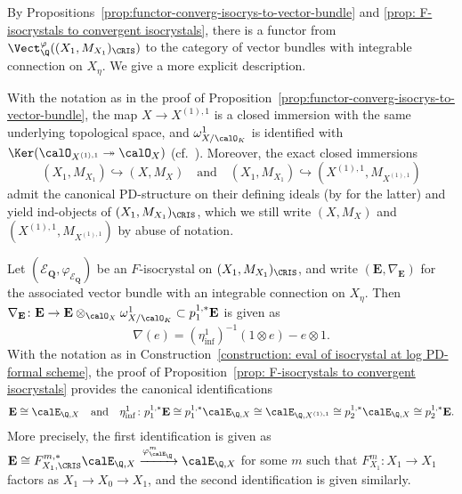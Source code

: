 \begin{rem}\label{rem:integrable connection associated to F-isocrystal}
By Propositions~\ref{prop:functor-converg-isocrys-to-vector-bundle} and \ref{prop: F-isocrystals to convergent isocrystals}, there is a functor from $\Vect_\Q^\varphi((X_1,M_{X_1})_\CRIS)$ to the category of vector bundles with integrable connection on $X_{\eta}$. We give a more explicit description.

With the notation as in the proof of Proposition~\ref{prop:functor-converg-isocrys-to-vector-bundle}, the map $X\rightarrow X^{(1),1}$ is a closed immersion with the same underlying topological space, and
$\omega^1_{X/\calO_K}$ is identified with $\Ker(\calO_{X^{(1),1}}\twoheadrightarrow\calO_X)$ (cf.~\cite[Prop.~3.2.5]{Shiho-I}).
Moreover, the exact closed immersions 
\[
(X_1,M_{X_1})\hookrightarrow (X,M_X) \quad\text{and}\quad (X_1,M_{X_1})\hookrightarrow (X^{(1),1},M_{X^{(1),1}})
\]
admit the canonical PD-structure on their defining ideals (by \cite[Ex.~3.2.4]{berthelot-ogus-book} for the latter) and yield ind-objects of $(X_1,M_{X_1})_\CRIS$, which we still write $(X,M_X)$ and $(X^{(1),1},M_{X^{(1),1}})$ by abuse of notation.

Let $(\mathcal{E}_{\mathbf{Q}},\varphi_{\mathcal{E}_{\mathbf{Q}}})$ be an $F$-isocrystal on $(X_1,M_{X_1})_{\CRIS}$, and write $(\mathbf{E},\nabla_{\mathbf{E}})$ for the associated vector bundle with an integrable connection on $X_{\eta}$. 
Then $\nabla_{\mathbf{E}}\colon \mathbf{E}\rightarrow \mathbf{E}\otimes_{\calO_X}\omega^1_{X/\calO_K}\subset p_{1}^{1,\ast}\mathbf{E}$ is given as 
\begin{equation}\label{eq:connection and stratification}
\nabla(e)=(\eta_{\mathrm{inf}}^1)^{-1}(1\otimes e)-e\otimes 1.
\end{equation}
With the notation as in Construction~\ref{construction: eval of isocrystal at log PD-formal scheme}, the proof of Proposition~\ref{prop: F-isocrystals to convergent isocrystals} provides the canonical identifications
\[
\mathbf{E}\cong\calE_{\Q,X}\quad\text{and}\quad
\eta_{\mathrm{inf}}^1\colon p_{1}^{1,\ast}\mathbf{E}\cong p_{1}^{1,\ast}\calE_{\Q,X}\cong \calE_{\Q,X^{(1),1}}\cong p_{2}^{1,\ast}\calE_{\Q,X}\cong p_{2}^{1,\ast}\mathbf{E}.
\]
More precisely, the first identification is given as $\mathbf{E}\cong F_{X_1,\CRIS}^{m,\ast}\calE_{\Q,X}\xrightarrow{\varphi_{\calE_\Q}^m}\calE_{\Q,X}$ for some $m$ such that $F_{X_1}^m\colon X_1\rightarrow X_1$ factors as $X_1\rightarrow X_0\rightarrow X_1$, and the second identification is given similarly. 


\end{rem}
